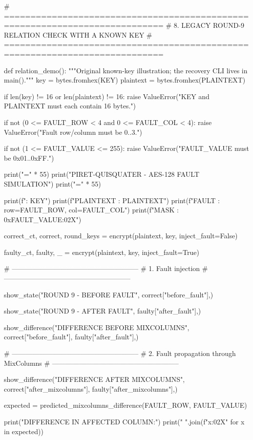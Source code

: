 \begin{lightcode}[numbers=left,firstnumber=1]
# ============================================================================
# 8. LEGACY ROUND-9 RELATION CHECK WITH A KNOWN KEY
# ============================================================================


def relation_demo():
    """Original known-key illustration; the recovery CLI lives in main()."""
    key = bytes.fromhex(KEY)
    plaintext = bytes.fromhex(PLAINTEXT)

    if len(key) != 16 or len(plaintext) != 16:
        raise ValueError("KEY and PLAINTEXT must each contain 16 bytes.")

    if not (0 <= FAULT_ROW < 4 and 0 <= FAULT_COL < 4):
        raise ValueError("Fault row/column must be 0..3.")

    if not (1 <= FAULT_VALUE <= 255):
        raise ValueError("FAULT_VALUE must be 0x01..0xFF.")

    print("=" * 55)
    print("PIRET-QUISQUATER - AES-128 FAULT SIMULATION")
    print("=" * 55)

    print(f"\nKEY       : {KEY}")
    print(f"PLAINTEXT : {PLAINTEXT}")
    print(f"FAULT     : row={FAULT_ROW}, col={FAULT_COL}")
    print(f"MASK      : 0x{FAULT_VALUE:02X}")

    correct_ct, correct, round_keys = encrypt(plaintext, key, inject_fault=False)

    faulty_ct, faulty, _ = encrypt(plaintext, key, inject_fault=True)

    # --------------------------------------------------------
    # 1. Fault injection
    # --------------------------------------------------------

    show_state("ROUND 9 - BEFORE FAULT", correct["before_fault"],)

    show_state("ROUND 9 - AFTER FAULT", faulty["after_fault"],)

    show_difference("DIFFERENCE BEFORE MIXCOLUMNS", correct["before_fault"], faulty["after_fault"],)

    # --------------------------------------------------------
    # 2. Fault propagation through MixColumns
    # --------------------------------------------------------

    show_difference("DIFFERENCE AFTER MIXCOLUMNS", correct["after_mixcolumns"], faulty["after_mixcolumns"],)

    expected = predicted_mixcolumns_difference(FAULT_ROW, FAULT_VALUE)

    print("\nPREDICTED DIFFERENCE IN AFFECTED COLUMN:")
    print(" ".join(f"{x:02X}" for x in expected))


\end{lightcode}
